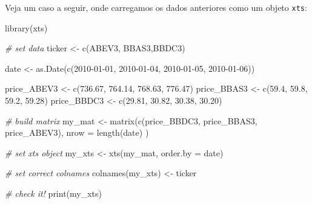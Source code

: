 \documentclass[
  11pt,
]{book}
\newenvironment{Shaded}{\begin{snugshade}}{\end{snugshade}}
\newcommand{\AttributeTok}[1]{\textcolor[rgb]{0.61,0.61,0.61}{#1}}
\newcommand{\CommentTok}[1]{\textcolor[rgb]{0.37,0.37,0.37}{\textit{#1}}}
\newcommand{\FloatTok}[1]{\textcolor[rgb]{0.06,0.06,0.06}{#1}}
\newcommand{\FunctionTok}[1]{\textcolor[rgb]{0,0,0}{#1}}
\newcommand{\NormalTok}[1]{#1}
\newcommand{\OtherTok}[1]{\textcolor[rgb]{0.37,0.37,0.37}{#1}}
\newcommand{\StringTok}[1]{\textcolor[rgb]{0.5,0.5,0.5}{#1}}
\begin{document}
Veja um caso a seguir, onde carregamos os dados anteriores como um objeto \texttt{xts}:

\begin{Shaded}
\begin{Highlighting}[]
\FunctionTok{library}\NormalTok{(xts)}

\CommentTok{\# set data}
\NormalTok{ticker }\OtherTok{\textless{}{-}} \FunctionTok{c}\NormalTok{(}\StringTok{\textquotesingle{}ABEV3\textquotesingle{}}\NormalTok{, }\StringTok{\textquotesingle{}BBAS3\textquotesingle{}}\NormalTok{,}\StringTok{\textquotesingle{}BBDC3\textquotesingle{}}\NormalTok{)}

\NormalTok{date }\OtherTok{\textless{}{-}} \FunctionTok{as.Date}\NormalTok{(}\FunctionTok{c}\NormalTok{(}\StringTok{\textquotesingle{}2010{-}01{-}01\textquotesingle{}}\NormalTok{, }\StringTok{\textquotesingle{}2010{-}01{-}04\textquotesingle{}}\NormalTok{,}
                  \StringTok{\textquotesingle{}2010{-}01{-}05\textquotesingle{}}\NormalTok{, }\StringTok{\textquotesingle{}2010{-}01{-}06\textquotesingle{}}\NormalTok{))}

\NormalTok{price\_ABEV3 }\OtherTok{\textless{}{-}} \FunctionTok{c}\NormalTok{(}\FloatTok{736.67}\NormalTok{, }\FloatTok{764.14}\NormalTok{, }\FloatTok{768.63}\NormalTok{, }\FloatTok{776.47}\NormalTok{)}
\NormalTok{price\_BBAS3 }\OtherTok{\textless{}{-}} \FunctionTok{c}\NormalTok{(}\FloatTok{59.4}\NormalTok{, }\FloatTok{59.8}\NormalTok{, }\FloatTok{59.2}\NormalTok{, }\FloatTok{59.28}\NormalTok{)}
\NormalTok{price\_BBDC3 }\OtherTok{\textless{}{-}} \FunctionTok{c}\NormalTok{(}\FloatTok{29.81}\NormalTok{, }\FloatTok{30.82}\NormalTok{, }\FloatTok{30.38}\NormalTok{, }\FloatTok{30.20}\NormalTok{)}

\CommentTok{\# build matrix}
\NormalTok{my\_mat }\OtherTok{\textless{}{-}} \FunctionTok{matrix}\NormalTok{(}\FunctionTok{c}\NormalTok{(price\_BBDC3, price\_BBAS3, price\_ABEV3),}
                 \AttributeTok{nrow =} \FunctionTok{length}\NormalTok{(date) )}

\CommentTok{\# set xts object}
\NormalTok{my\_xts }\OtherTok{\textless{}{-}} \FunctionTok{xts}\NormalTok{(my\_mat,}
              \AttributeTok{order.by =}\NormalTok{ date)}

\CommentTok{\# set correct colnames}
\FunctionTok{colnames}\NormalTok{(my\_xts) }\OtherTok{\textless{}{-}}\NormalTok{ ticker}

\CommentTok{\# check it!}
\FunctionTok{print}\NormalTok{(my\_xts)}
\end{Highlighting}
\end{Shaded}
\end{document}
